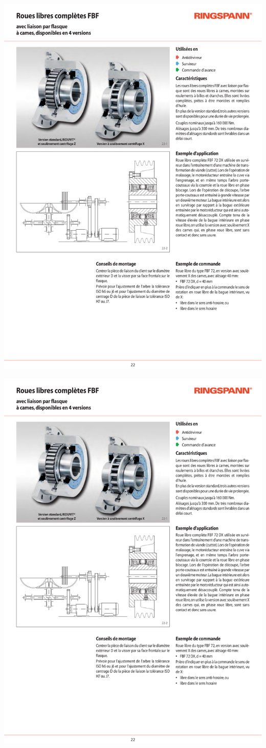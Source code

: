 \documentclass[10pt,fleqn]{article} %
\begin{document}
\begin{center}
\includegraphics[page=1,width=.95\textwidth]{images/rouelibre_Ringspann_02}

\includegraphics[page=2,width=.95\textwidth]{images/rouelibre_Ringspann_02}
\end{center}
\end{document}
